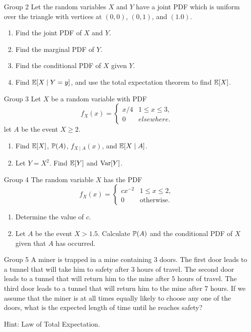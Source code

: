 \documentclass{article}
\begin{document}
\begin{problem}
    {Group 2}
    Let the random variables $X$ and $Y$ have a joint PDF which is uniform over the triangle with vertices at $(0, 0)$, $(0, 1)$, and $(1. 0)$.
    \begin{enumerate}
        \item Find the joint PDF of $X$ and $Y$.
        \item Find the marginal PDF of $Y$.
        \item Find the conditional PDF of $X$ given $Y$.
        \item Find $\condE{X}{Y = y}$, and use the total expectation theorem to find $\E{X}$.
    \end{enumerate}
\end{problem}

\begin{problem}
    {Group 3}
    Let $X$ be a random variable with PDF
    \[
        f_X(x) = {
            \begin{cases}
                x/4 & 1 \leq x \leq 3,\\
                0 & elsewhere.
            \end{cases}
        }
    \]
    let $A$ be the event ${X \geq 2}$.
    \begin{enumerate}
        \item Find $\E{X}$, $\P{A}$, $f_{X\mid A}(x)$, and $\E{X \mid A}$.
        \item Let $Y = X^2$. Find $\E{Y}$ and $\mathop{\mathrm{Var}}\nolimits[Y]$.
    \end{enumerate}
\end{problem}

\begin{problem}
    {Group 4}
    The random variable $X$ has the PDF
    \[
        f_X(x)={
            \begin{cases}
                cx^{-2} & 1\leq x\leq 2,\\
                0 & \text{otherwise.}
            \end{cases}
        }
    \]
    \begin{enumerate}
        \item Determine the value of $c$.
        \item Let $A$ be the event ${X > 1.5}$. Calculate $\P{A}$ and the conditional PDF of $X$ given that $A$ has occurred.
    \end{enumerate}
\end{problem}

\begin{problem}
    {Group 5}
    A miner is trapped in a mine containing $3$ doors. The first door leads to a tunnel that will take him to safety after $3$ hours of travel. The second door leads to a tunnel that will return him to the mine after $5$ hours of travel. The third door leads to a tunnel that will return him to the mine after $7$ hours. If we assume that the miner is at all times equally likely to choose any one of the doors, what is the expected length of time until he reaches safety?
    \begin{solution}
        {Hint:}
        Law of Total Expectation.
    \end{solution}
\end{problem}
\fi
\end{document}
